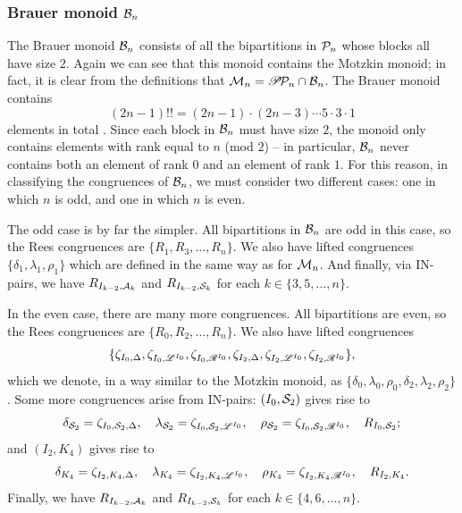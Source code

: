 \subsubsection{Brauer monoid $\mathcal{B}_n$}
The Brauer monoid $\mathcal{B}_n$ consists of all the bipartitions in $\mathcal{P}_n$ whose
blocks all have size $2$.  Again we can see that this monoid contains the
Motzkin monoid; in fact, it is clear from the definitions that
$\mathcal{M}_n = \mathscr{P}\!\mathcal{P}_n \cap \mathcal{B}_n$.
The Brauer monoid contains
$$(2n-1)!! = (2n-1) \cdot (2n-3)\cdots 5 \cdot 3 \cdot 1$$
elements in total .
Since each block in $\mathcal{B}_n$ must have
size $2$, the monoid only contains elements with rank equal to $n$ (mod
$2$) -- in particular, $\mathcal{B}_n$ never contains both an element of rank $0$ and
an element of rank $1$.  For this reason, in classifying the congruences of
$\mathcal{B}_n$, we must consider two different cases: one in which $n$ is odd, and
one in which $n$ is even.

The odd case is by far the simpler.  All bipartitions in $\mathcal{B}_n$ are odd in
this case, so the Rees congruences are $\{R_1, R_3, \ldots, R_n\}$.  We also
have lifted congruences $\{\delta_1, \lambda_1, \rho_1\}$ which are defined in
the same way as for $\mathcal{M}_n$.  And finally, via IN-pairs, we have
$R_{I_{k-2}, \mathcal{A}_k}$ and $R_{I_{k-2}, \mathcal{S}_k}$ for each
$k \in \{3, 5, \ldots, n\}$.

In the even case, there are many more congruences.  All bipartitions are even,
so the Rees congruences are $\{R_0, R_2, \ldots, R_n\}$.  We also have lifted
congruences
$$\{\zeta_{I_0,\Delta}, \zeta_{I_0,\mathscr{L}^{I_0}}, \zeta_{I_0,\mathscr{R}^{I_0}},
\zeta_{I_2,\Delta}, \zeta_{I_2,\mathscr{L}^{I_0}}, \zeta_{I_2,\mathscr{R}^{I_0}}\},$$ which we
denote, in a way similar to the Motzkin monoid, as
$\{\delta_0, \lambda_0, \rho_0, \delta_2, \lambda_2, \rho_2\}$.
Some more congruences arise from IN-pairs: $(I_0, \mathcal{S}_2)$ gives rise
to $$\delta_{\mathcal{S}_2} = \zeta_{I_0,\mathcal{S}_2,\Delta},\quad
\lambda_{\mathcal{S}_2} = \zeta_{I_0,\mathcal{S}_2,\mathscr{L}^{I_0}},\quad
\rho_{\mathcal{S}_2} = \zeta_{I_0,\mathcal{S}_2,\mathscr{R}^{I_0}},\quad
R_{I_0,\mathcal{S}_2};$$
and $(I_2, K_4)$ gives rise to
$$\delta_{K_4} = \zeta_{I_2,K_4,\Delta},\quad
\lambda_{K_4} = \zeta_{I_2,K_4,\mathscr{L}^{I_0}},\quad
\rho_{K_4} = \zeta_{I_2,K_4,\mathscr{R}^{I_0}},\quad
R_{I_2,K_4}.$$
Finally, we have $R_{I_{k-2},\mathcal{A}_k}$ and $R_{I_{k-2},\mathcal{S}_k}$ for each $k \in
\{4, 6, \ldots, n\}$.

